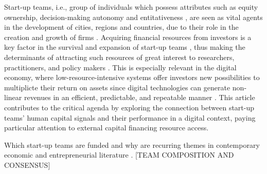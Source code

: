 \documentclass[12pt]{article}
\begin{document}
Start-up teams, i.e., group of individuals which possess attributes such as equity ownership, decision-making autonomy and entitativeness \citep{knight2020start}, are seen as vital agents in the development of cities, regions and countries, due to their role in the creation and growth of firms \citep{audretsch2001linking, autio2016entrepreneurship}. Acquiring financial resources from investors is a key factor in the survival and expansion of start-up teams \citep{rosenbusch2013does}, thus making the determinants of attracting such resources of great interest to researchers, practitioners, and policy makers \citep{EUcommission2015digital}. This is especially relevant in the digital economy, where low-resource-intensive systems offer investors new possibilities to multiplicte their return on assets since digital technologies can generate non-linear revenues in an efficient, predictable, and repeatable manner \citep{nambisan2017digital, sahut2021age}. This article contributes to the critical agenda by exploring the connection between start-up teams' human capital signals and their performance in a digital context, paying particular attention to external capital financing resource access.

Which start-up teams are funded and why are recurring themes in contemporary economic and entrepreneurial literature \citep{baum2004picking, beckman2007early, bernstein2017attracting, franke2006you, franke2008venture, kaplan2009should, plummer2016better, shane2002network}. [TEAM COMPOSITION AND CONSENSUS]
\end{document}
